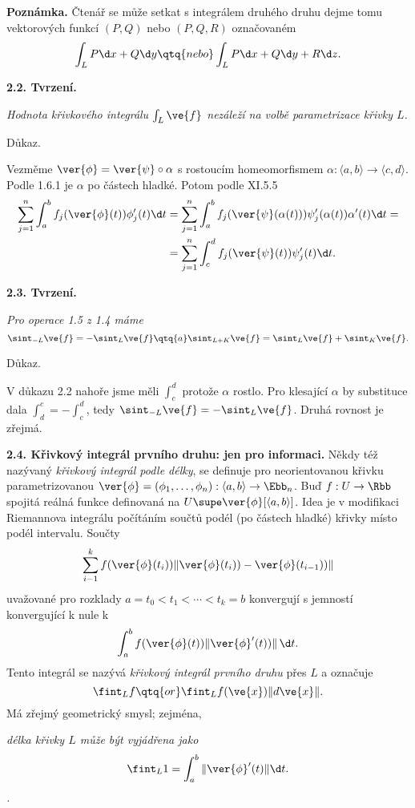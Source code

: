 \documentclass[12pt]{article}
\begin{document}
\medskip

{\bf Poznámka.}
Čtenář se může setkat s integrálem druhého druhu dejme tomu
vektorových funkcí $(P,Q)$ nebo $(P,Q,R)$ označovaném
$$
\int_LP \d x+Q \d y \qtq{nebo} \int_LP \d x+Q \d y +R \d z.
$$

\bigskip

{\bf 2.2. Tvrzení.} {\em Hodnota křivkového integrálu  $\int_L\ve{f}$ nezáleží na volbě parametrizace křivky $L$.

Důkaz.} Vezměme $\ver{\phi}=\ver{\psi}\circ\alpha$ s rostoucím homeomorfismem $\alpha:\langle a,b\rangle
\to\langle c,d\rangle$. Podle 1.6.1 je $\alpha$ po částech hladké. Potom podle
XI.5.5 
$$
\begin{aligned}
\sum_{j=1}^n\int_a^bf_j(\ver{\phi}(t))\phi_j'(t)\d t&=
\sum_{j=1}^n\int_a^bf_j(\ver{\psi}(\alpha(t)))\psi_j'(\alpha(t))\alpha'(t)\d t=\\
&=\sum_{j=1}^n\int_c^df_j(\ver{\psi}(t))\psi_j'(t)\d t.
\end{aligned}
$$\sq

\bigskip

{\bf 2.3. Tvrzení.} {\em Pro operace 1.5 z 1.4 máme
$$
\sint_{-L}\ve{f}=-\sint_L\ve{f} \qtq{a} \sint_{L+K}\ve{f}=
\sint_{L}\ve{f}+\sint_{K}\ve{f}.
$$

Důkaz.} V důkazu 2.2 nahoře jsme měli $\int_c^d$ protože $\alpha$ rostlo. Pro klesající $\alpha$ by substituce dala $\int_d^c=-\int_c^d$, 
tedy $\sint_{-L}\ve{f}=-\sint_L\ve{f}$. Druhá rovnost je zřejmá. \sq

\bigskip

{\bf 2.4. Křivkový integrál prvního druhu: jen pro informaci.} Někdy též nazývaný {\em křivkový integrál podle délky},
se definuje pro neorientovanou křivku parametrizovanou
 $\ver{\phi}=
(\phi_1,\dots,\phi_n):\langle a,b\rangle\to\Ebb_n$. Buď
$f:U\to\Rbb$ spojitá reálná funkce definovaná na $U\supe
\ver{\phi}[\langle a,b\rangle]$. Idea je v modifikaci Riemannova integrálu počítáním součtů podél
 (po částech hladké) křivky místo podél intervalu. 
Součty
$$
\sum_{i-1}^kf(\ver{\phi}(t_i))\|\ver{\phi}(t_i))-\ver{\phi}(t_{i-1}))\|
$$
uvažované pro rozklady $a=t_0<t_1<\cdots<t_k=b$ konvergují s jemností konvergující k nule k 
$$
\int_a^bf(\ver{\phi}(t))\|\ver{\phi}'(t))\|\,\d t.
$$
Tento integrál se nazývá {\em křivkový integrál prvního druhu} přes $L$ a označuje
$$
\fint_Lf \qtq{or} \fint_Lf(\ve{x})\|d \ve{x}\|.
$$
Má zřejmý geometrický smysl; zejména,

{\em  délka křivky $L$ může být vyjádřena jako
$$
\fint_L1=\int_a^b\|\ver{\phi}'(t)\|\d t.
$$.}
\end{document}
